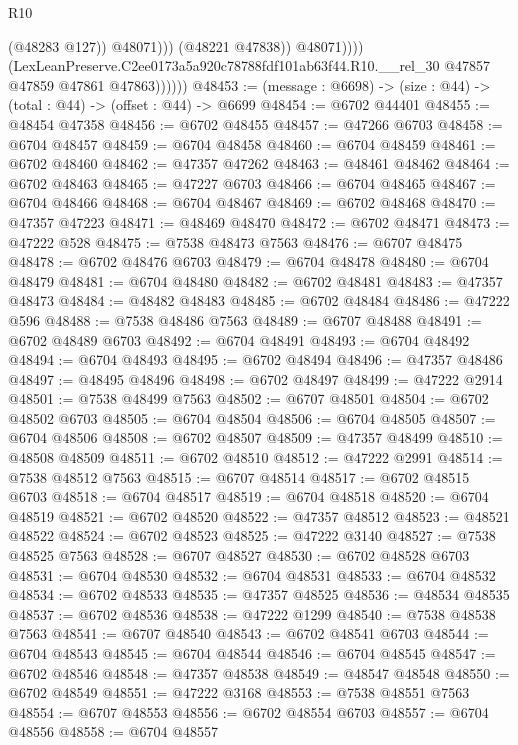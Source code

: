 \begin{lexlean}{R10}
\begin{coremodule}
                                (@48283 @127))
                              @48071)))
                        (@48221 @47838))
                      @48071))))
              (LexLeanPreserve.C2ee0173a5a920c78788fdf101ab63f44.R10.__rel_30
                @47857
                @47859
                @47861
                @47863))))))
@48453 := (message : @6698) -> (size : @44) -> (total : @44) -> (offset : @44) -> @6699
@48454 := @6702 @44401
@48455 := @48454 @47358
@48456 := @6702 @48455
@48457 := @47266 @6703
@48458 := @6704 @48457
@48459 := @6704 @48458
@48460 := @6704 @48459
@48461 := @6702 @48460
@48462 := @47357 @47262
@48463 := @48461 @48462
@48464 := @6702 @48463
@48465 := @47227 @6703
@48466 := @6704 @48465
@48467 := @6704 @48466
@48468 := @6704 @48467
@48469 := @6702 @48468
@48470 := @47357 @47223
@48471 := @48469 @48470
@48472 := @6702 @48471
@48473 := @47222 @528
@48475 := @7538 @48473 @7563
@48476 := @6707 @48475
@48478 := @6702 @48476 @6703
@48479 := @6704 @48478
@48480 := @6704 @48479
@48481 := @6704 @48480
@48482 := @6702 @48481
@48483 := @47357 @48473
@48484 := @48482 @48483
@48485 := @6702 @48484
@48486 := @47222 @596
@48488 := @7538 @48486 @7563
@48489 := @6707 @48488
@48491 := @6702 @48489 @6703
@48492 := @6704 @48491
@48493 := @6704 @48492
@48494 := @6704 @48493
@48495 := @6702 @48494
@48496 := @47357 @48486
@48497 := @48495 @48496
@48498 := @6702 @48497
@48499 := @47222 @2914
@48501 := @7538 @48499 @7563
@48502 := @6707 @48501
@48504 := @6702 @48502 @6703
@48505 := @6704 @48504
@48506 := @6704 @48505
@48507 := @6704 @48506
@48508 := @6702 @48507
@48509 := @47357 @48499
@48510 := @48508 @48509
@48511 := @6702 @48510
@48512 := @47222 @2991
@48514 := @7538 @48512 @7563
@48515 := @6707 @48514
@48517 := @6702 @48515 @6703
@48518 := @6704 @48517
@48519 := @6704 @48518
@48520 := @6704 @48519
@48521 := @6702 @48520
@48522 := @47357 @48512
@48523 := @48521 @48522
@48524 := @6702 @48523
@48525 := @47222 @3140
@48527 := @7538 @48525 @7563
@48528 := @6707 @48527
@48530 := @6702 @48528 @6703
@48531 := @6704 @48530
@48532 := @6704 @48531
@48533 := @6704 @48532
@48534 := @6702 @48533
@48535 := @47357 @48525
@48536 := @48534 @48535
@48537 := @6702 @48536
@48538 := @47222 @1299
@48540 := @7538 @48538 @7563
@48541 := @6707 @48540
@48543 := @6702 @48541 @6703
@48544 := @6704 @48543
@48545 := @6704 @48544
@48546 := @6704 @48545
@48547 := @6702 @48546
@48548 := @47357 @48538
@48549 := @48547 @48548
@48550 := @6702 @48549
@48551 := @47222 @3168
@48553 := @7538 @48551 @7563
@48554 := @6707 @48553
@48556 := @6702 @48554 @6703
@48557 := @6704 @48556
@48558 := @6704 @48557

\end{coremodule}
\end{lexlean}
